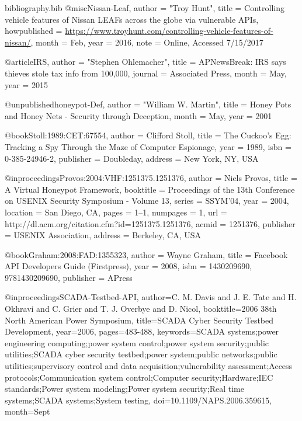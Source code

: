 \begin{filecontents}{bibliography.bib}
@misc{Nissan-Leaf,
    author = "{Troy Hunt}",
    title = {{Controlling vehicle features of Nissan LEAFs across the globe via vulnerable APIs}},
    howpublished = {\url{https://www.troyhunt.com/controlling-vehicle-features-of-nissan/}},
    month = {Feb},
    year = {2016},
    note = {Online, Accessed 7/15/2017}
}

@article{IRS,
    author = "{Stephen Ohlemacher}",
    title = {APNewsBreak: IRS says thieves stole tax info from 100,000},
    journal = {Associated Press},
    month = May,
    year = {2015}
}

@unpublished{honeypot-Def,
    author = "{William W. Martin}",
    title = {{Honey Pots and Honey Nets - Security through Deception}},
    month = {May},
    year = {2001}
}

@book{Stoll:1989:CET:67554,
     author = {Clifford Stoll},
     title = {The Cuckoo's Egg: Tracking a Spy Through the Maze of Computer Espionage},
     year = {1989},
     isbn = {0-385-24946-2},
     publisher = {Doubleday},
     address = {New York, NY, USA}
}

@inproceedings{Provos:2004:VHF:1251375.1251376,
     author = {Niels Provos},
     title = {A Virtual Honeypot Framework},
     booktitle = {Proceedings of the 13th Conference on USENIX Security Symposium - Volume 13},
     series = {SSYM'04},
     year = {2004},
     location = {San Diego, CA},
     pages = {1--1},
     numpages = {1},
     url = {http://dl.acm.org/citation.cfm?id=1251375.1251376},
     acmid = {1251376},
     publisher = {USENIX Association},
     address = {Berkeley, CA, USA}
} 

@book{Graham:2008:FAD:1355323,
     author = {Wayne Graham},
     title = {Facebook API Developers Guide (Firstpress)},
     year = {2008},
     isbn = {1430209690, 9781430209690},
     publisher = {APress}
} 

@inproceedings{SCADA-Testbed-API, 
    author={C. M. Davis and J. E. Tate and H. Okhravi and C. Grier and T. J. Overbye and D. Nicol}, 
    booktitle={2006 38th North American Power Symposium}, 
    title={SCADA Cyber Security Testbed Development}, 
    year={2006}, 
    pages={483-488}, 
    keywords={SCADA systems;power engineering computing;power system control;power system security;public utilities;SCADA cyber security testbed;power system;public networks;public utilities;supervisory control and data acquisition;vulnerability assessment;Access protocols;Communication system control;Computer security;Hardware;IEC standards;Power system modeling;Power system security;Real time systems;SCADA systems;System testing}, 
    doi={10.1109/NAPS.2006.359615}, 
    month={Sept}
}


\end{filecontents}
